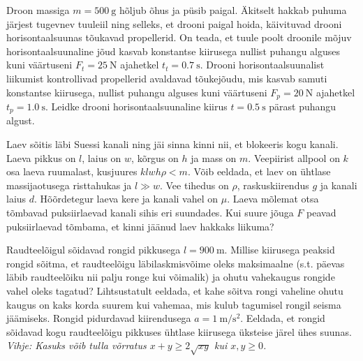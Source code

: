 \documentclass[10pt]{article}
\begin{document}

Droon massiga $m=\SI{500}\g$ hõljub õhus ja püsib paigal. Äkitselt hakkab puhuma järjest tugevnev tuuleiil ning selleks, et drooni paigal hoida, käivituvad drooni horisontaalsuunas tõukavad propellerid. On teada, et tuule poolt droonile mõjuv horisontaalsuunaline jõud kasvab konstantse kiirusega nullist puhangu alguses kuni väärtuseni $F_t=\SI{25}\N$ ajahetkel $t_t= \SI{0.7}\s$. Drooni horisontaalsuunalist liikumist kontrollivad propellerid avaldavad tõukejõudu, mis kasvab samuti konstantse kiirusega, nullist puhangu alguses kuni väärtuseni $F_p=\SI{20}\N$ ajahetkel $t_p= \SI{1.0}\s$. Leidke drooni horisontaalsuunaline kiirus $t=\SI{0.5}\s$ pärast puhangu algust.
\probend
\bigskip


Laev sõitis läbi Suessi kanali ning jäi sinna kinni nii, et blokeeris kogu kanali. Laeva pikkus on $l$, laius on $w$, kõrgus on $h$ ja mass on $m$. Veepiirist allpool on $k$ osa laeva ruumalast, kusjuures $klwh\rho < m$. Võib eeldada, et laev on ühtlase massijaotusega risttahukas ja $l \gg w$. Vee tihedus on $\rho$, raskuskiirendus $g$ ja kanali laius $d$. Hõõrdetegur laeva kere ja kanali vahel on $\mu$. Laeva mõlemat otsa tõmbavad puksiirlaevad kanali sihis eri suundades. Kui suure jõuga $F$ peavad puksiirlaevad tõmbama, et kinni jäänud laev hakkaks liikuma?
\probend
\bigskip


Raudteelõigul sõidavad rongid pikkusega $l=\SI{900}{\m}$. Millise kiirusega peaksid rongid sõitma, et raudteelõigu läbilaskmisvõime oleks maksimaalne (s.t. päevas läbib raudteelõiku nii palju ronge kui võimalik) ja ohutu vahekaugus rongide vahel oleks tagatud? Lihtsustatult eeldada, et kahe sõitva rongi vaheline ohutu kaugus on kaks korda suurem kui vahemaa, mis kulub tagumisel rongil seisma jäämiseks. Rongid pidurdavad kiirendusega $a=\SI{1}{\m\per\s\squared}$. Eeldada, et rongid sõidavad kogu raudteelõigu pikkuses ühtlase kiirusega üksteise järel ühes suunas. \\
\textit{Vihje: Kasuks võib tulla võrratus $x+y \geq 2\sqrt{xy}$ kui $x, y \geq 0$.}
\probend
\bigskip
\end{document}
